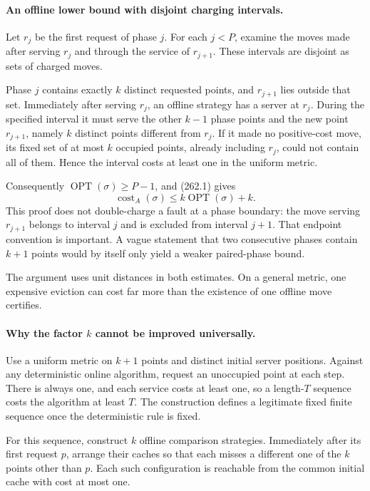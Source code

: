 \documentclass[11pt]{article}
\begin{document}
\paragraph{An offline lower bound with disjoint charging intervals.}
Let $r_j$ be the first request of phase $j$. For each $j<P$, examine the moves made after serving $r_j$ and through the service of $r_{j+1}$. These intervals are disjoint as sets of charged moves.

Phase $j$ contains exactly $k$ distinct requested points, and $r_{j+1}$ lies outside that set. Immediately after serving $r_j$, an offline strategy has a server at $r_j$. During the specified interval it must serve the other $k-1$ phase points and the new point $r_{j+1}$, namely $k$ distinct points different from $r_j$. If it made no positive-cost move, its fixed set of at most $k$ occupied points, already including $r_j$, could not contain all of them. Hence the interval costs at least one in the uniform metric.

Consequently $\operatorname{OPT}(\sigma)\ge P-1$, and (262.1) gives
\[
 \operatorname{cost}_A(\sigma)\le k\operatorname{OPT}(\sigma)+k.
 \tag{262.2}
\]
This proof does not double-charge a fault at a phase boundary: the move serving $r_{j+1}$ belongs to interval $j$ and is excluded from interval $j+1$. That endpoint convention is important. A vague statement that two consecutive phases contain $k+1$ points would by itself only yield a weaker paired-phase bound.

The argument uses unit distances in both estimates. On a general metric, one expensive eviction can cost far more than the existence of one offline move certifies.

\paragraph{Why the factor $k$ cannot be improved universally.}
Use a uniform metric on $k+1$ points and distinct initial server positions. Against any deterministic online algorithm, request an unoccupied point at each step. There is always one, and each service costs at least one, so a length-$T$ sequence costs the algorithm at least $T$. The construction defines a legitimate fixed finite sequence once the deterministic rule is fixed.

For this sequence, construct $k$ offline comparison strategies. Immediately after its first request $p$, arrange their caches so that each misses a different one of the $k$ points other than $p$. Each such configuration is reachable from the common initial cache with cost at most one.
\end{document}
